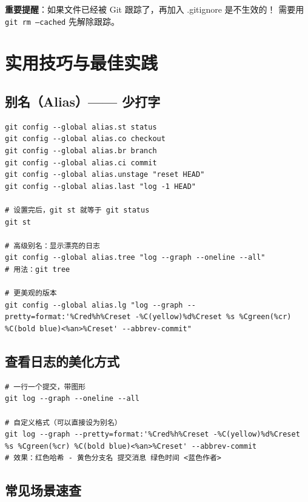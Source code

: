 \documentclass[12pt,a4paper]{article}
\begin{document}
\textbf{重要提醒}：如果文件已经被 Git 跟踪了，再加入 .gitignore 是不生效的！
需要用 \texttt{git rm --cached} 先解除跟踪。

\section{实用技巧与最佳实践}

\subsection{别名（Alias）—— 少打字}

\begin{lstlisting}
git config --global alias.st status
git config --global alias.co checkout
git config --global alias.br branch
git config --global alias.ci commit
git config --global alias.unstage "reset HEAD"
git config --global alias.last "log -1 HEAD"

# 设置完后，git st 就等于 git status
git st

# 高级别名：显示漂亮的日志
git config --global alias.tree "log --graph --oneline --all"
# 用法：git tree

# 更美观的版本
git config --global alias.lg "log --graph --pretty=format:'%Cred%h%Creset -%C(yellow)%d%Creset %s %Cgreen(%cr) %C(bold blue)<%an>%Creset' --abbrev-commit"
\end{lstlisting}

\subsection{查看日志的美化方式}

\begin{lstlisting}
# 一行一个提交，带图形
git log --graph --oneline --all

# 自定义格式（可以直接设为别名）
git log --graph --pretty=format:'%Cred%h%Creset -%C(yellow)%d%Creset %s %Cgreen(%cr) %C(bold blue)<%an>%Creset' --abbrev-commit
# 效果：红色哈希 - 黄色分支名 提交消息 绿色时间 <蓝色作者>
\end{lstlisting}

\subsection{常见场景速查}
\end{document}
